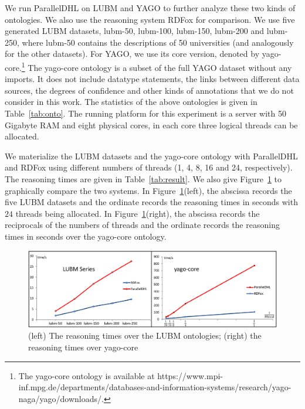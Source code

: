 We run ParallelDHL on LUBM and YAGO to further analyze these
two kinds of ontologies. We also use the reasoning system RDFox \cite{MotikNPHO14}
for comparison. We use five generated LUBM datasets, lubm-50, lubm-100, lubm-150, lubm-200
and lubm-250, where lubm-50 contains the descriptions of 50
universities (and analogously for the other datasets). For YAGO, we use its core version, denoted by yago-core.\footnote{
The yago-core ontology is available at https://www.mpi-inf.mpg.de/departments/databases-and-information-systems/research/yago-naga/yago/downloads/.}
The yago-core ontology is a subset of the full YAGO dataset without any imports.
It does not include datatype statements, the links
between different data sources, the degrees of confidence and other kinds of
annotations that we do not consider in this work. The statistics of the above ontologies is given in Table~\ref{tab:onto}.
The running platform for this experiment is a server with 50 Gigabyte RAM and eight physical cores, in each core
three logical threads can be allocated.

We materialize the LUBM datasets and the yago-core ontology with ParallelDHL and RDFox using different numbers of
threads (1, 4, 8, 16 and 24, respectively).
The reasoning times are given in Table~\ref{tab:result}. We also give Figure~\ref{fig:reasoningtime} to
graphically compare the two systems.
In Figure~\ref{fig:reasoningtime}(left), the abscissa records the five
LUBM datasets and
the ordinate records the reasoning times in seconds with $24$ threads being allocated.
In Figure~\ref{fig:reasoningtime}(right), the abscissa records the
reciprocals  of the numbers of threads and
the ordinate records the reasoning times in seconds over the yago-core ontology.


\begin{figure}[htbp]
\begin{center}
\includegraphics[width=\textwidth]{fig-reasoningtime.eps}
\caption{(left) The reasoning times over the LUBM ontologies; (right)
  the reasoning times over yago-core }
\label{fig:reasoningtime}
\end{center}
\end{figure}

